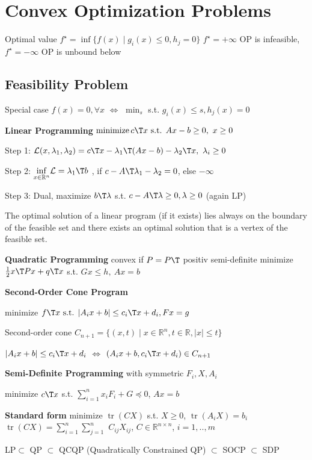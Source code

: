 \section{Convex Optimization Problems}

Optimal value $f^\star =
	\operatorname{inf}\{f(x)\mid
	g_i(x)\le0,h_j=0 \}$
$f^\star=+\infty$ OP is infeasible,
$f^\star=-\infty$ OP is unbound below

\subsection{Feasibility  Problem}

Special case $f(x)=0,\forall x$
$\Leftrightarrow$
$\min_s$ s.t. $g_i(x)\le s,h_j(x)=0$

\textbf{Linear Programming}
$ \operatorname{minimize} c\T x
	\text{ s.t. } Ax-b \ge 0,\ x\ge0$

Step 1:
$\mathcal{L}(x,\lambda_1,\lambda_2) =
	c\T x-\lambda_1\T (Ax-b) -\lambda_2\T x,\ \lambda_i \ge0$

Step 2:
$\underset{x \in \mathcal{\mathbb{R}}^n}{\operatorname{inf}}
	\mathcal{L}=\lambda_1\T b$
, if $c-A\T\lambda_1-\lambda_2=0$, else $-\infty$

Step 3: Dual,
maximize $b\T\lambda$
s.t.
$c-A\T\lambda\ge0,\lambda\ge0$
(again LP)

\begin{proposition}
	The optimal solution of a linear program (if it exists)
	lies always on the boundary of the feasible set
	and there exists an optimal solution that is a vertex of the feasible set.
\end{proposition}


\textbf{Quadratic Programming}
convex if $P=P\T$ positiv semi-definite
minimize $\frac{1}{2}x\T Px+q\T x$
s.t. $Gx\le h,\ Ax=b$


\textbf{Second-Order Cone Program}

minimize $f\T x \text{ s.t. }
	|A_ix+b|\le c_i\T x+d_i, Fx=g$

Second-order cone
$C_{n+1}=\{ (x,t)\mid
	x\in\mathbb{R}^{n}, t\in \mathbb{R}, |x|\le t \}$

$|A_ix+b|\le c_i\T x+d_i$
$\Leftrightarrow$
$(A_ix+b, c_i\T x+d_i)\in C_{n+1}$

\textbf{Semi-Definite Programming} with symmetric $F_i,X,A_i$

minimize $c\T x$
s.t.
$\sum_{i=1}^{n}x_iF_i+G\preceq0$,
$Ax=b$

\textbf{Standard form}
minimize $\operatorname{tr}(CX)$
s.t.
$X\ge0$,
$\operatorname{tr}(A_iX)=b_i$
$\operatorname{tr}(CX)=\sum_{i=1}^{n}\sum_{j=1}^{n}$
$C_{ij}X_{ij}$,
$C\in\mathbb{R}^{n\times n}$,
$i=1,..,m$

LP$\subset$ QP $\subset$ QCQP
\scriptsize
(Quadratically Constrained QP)
\footnotesize
$\subset$ SOCP $\subset$ SDP









